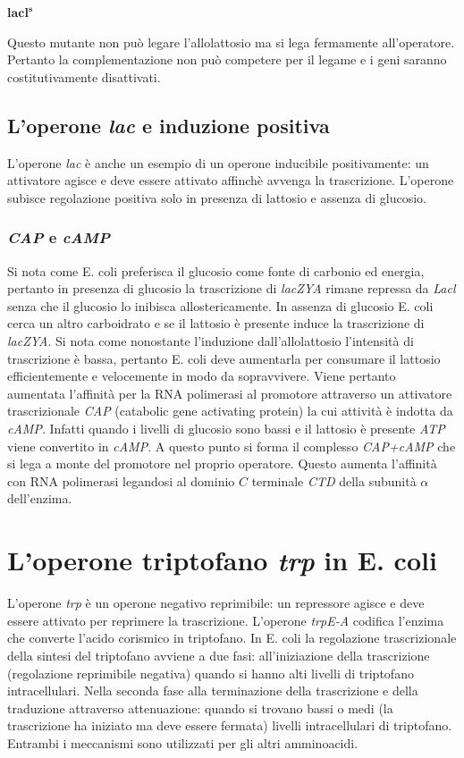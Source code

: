 \paragraph{$\mathbf{lacl^s}$}
Questo mutante non pu\`o legare l'allolattosio ma si lega fermamente all'operatore. Pertanto la complementazione non pu\`o competere per il legame e i geni saranno costitutivamente 
disattivati. 
\subsection{L'operone \emph{lac} e induzione positiva}
L'operone \emph{lac} \`e anche un esempio di un operone inducibile positivamente: un attivatore agisce e deve essere attivato affinch\`e avvenga la trascrizione. L'operone subisce
regolazione positiva solo in presenza di lattosio e assenza di glucosio. 
\subsubsection{\emph{CAP} e \emph{cAMP}}
Si nota come E. coli preferisca il glucosio come fonte di carbonio ed energia, pertanto in presenza di glucosio la trascrizione di \emph{lacZYA} rimane repressa da \emph{Lacl} senza 
che il glucosio lo inibisca allostericamente. In assenza di glucosio E. coli cerca un altro carboidrato e se il lattosio \`e presente induce la trascrizione di \emph{lacZYA}. Si nota
come nonostante l'induzione dall'allolattosio l'intensit\`a di trascrizione \`e bassa, pertanto E. coli deve aumentarla per consumare il lattosio efficientemente e velocemente in modo
da sopravvivere. Viene pertanto aumentata l'affinit\`a per la RNA polimerasi al promotore attraverso un attivatore trascrizionale \emph{CAP} (catabolic gene activating protein) la cui
attivit\`a \`e indotta da \emph{cAMP}. Infatti quando i livelli di glucosio sono bassi e il lattosio \`e presente \emph{ATP} viene convertito in \emph{cAMP}. A questo punto si forma 
il complesso \emph{CAP+cAMP} che si lega a monte del promotore nel proprio operatore. Questo aumenta l'affinit\`a con RNA polimerasi legandosi al dominio $C$ terminale \emph{CTD} 
della subunit\`a $\alpha$ dell'enzima. 
\section{L'operone triptofano \emph{trp} in E. coli}
L'operone \emph{trp} \`e un operone negativo reprimibile: un repressore agisce e deve essere attivato per reprimere la trascrizione. L'operone \emph{trpE-A} codifica l'enzima che
converte l'acido corismico in triptofano. In E. coli la regolazione trascrizionale della sintesi del triptofano avviene a due fasi: all'iniziazione della trascrizione (regolazione
reprimibile negativa) quando si hanno alti livelli di triptofano intracellulari. Nella seconda fase alla terminazione della trascrizione e della traduzione attraverso attenuazione: 
quando si trovano bassi o medi (la trascrizione ha iniziato ma deve essere fermata) livelli intracellulari di triptofano. Entrambi i meccanismi sono utilizzati per gli altri amminoacidi.
